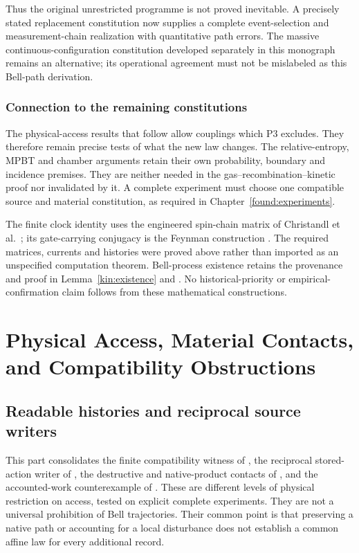 \documentclass[11pt,oneside,openany]{book}
\theoremstyle{definition}
\theoremstyle{remark}\newtheorem{remark}[theorem]{Remark}
\begin{document}
Thus the original unrestricted programme is not proved inevitable. A precisely stated replacement constitution now supplies a complete event-selection and measurement-chain realization with quantitative path errors. The massive continuous-configuration constitution developed separately in this monograph remains an alternative; its operational agreement must not be mislabeled as this Bell-path derivation.


\section{Connection to the remaining constitutions}
The physical-access results that follow allow couplings which P3 excludes.
They therefore remain precise tests of what the new law changes.  The
relative-entropy, MPBT and chamber arguments retain their own probability,
boundary and incidence premises.  They are neither needed in the
gas--recombination--kinetic proof nor invalidated by it.  A complete
experiment must choose one compatible source and material constitution,
as required in Chapter~\ref{found:experiments}.

The finite clock identity uses the engineered spin-chain matrix of
Christandl et al.\ \cite{pChristandl2004}; its gate-carrying conjugacy is
the Feynman construction \cite{pFeynman1986}.  The required matrices,
currents and histories were proved above rather than imported as an
unspecified computation theorem.  Bell-process existence retains the
provenance and proof in Lemma~\ref{kin:existence} and \cite{BellQFT}.
No historical-priority or empirical-confirmation claim follows from
these mathematical constructions.


\part{Physical Access, Material Contacts, and Compatibility Obstructions}\label{part:access}

\providecommand{\accTV}{d_{\mathrm{TV}}}
\providecommand{\accLaw}{\operatorname{Law}}
\providecommand{\accVar}{\operatorname{Var}}

\chapter{Readable histories and reciprocal source writers}
\label{acc:histories}

This part consolidates the finite compatibility witness of \cite{M11},
the reciprocal stored-action writer of \cite{M21}, the destructive and
native-product contacts of \cite{M22,M23}, and the accounted-work
counterexample of \cite{M25}. These are different levels of physical
restriction on access, tested on explicit complete experiments. They are
not a universal prohibition of Bell trajectories. Their common point is
that preserving a native path or accounting for a local disturbance does
not establish a common affine law for every additional record.
\end{document}
